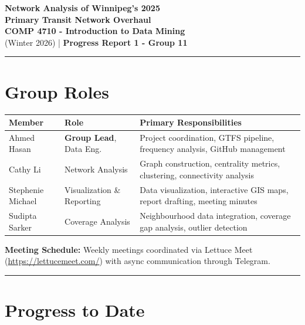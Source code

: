 \documentclass[11pt]{article}
\begin{document}
\small
\begin{center}
    {\LARGE \textbf{Network Analysis of Winnipeg's 2025\\Primary Transit Network Overhaul}}\\[0.4em]
    {\large \textbf{COMP 4710 - Introduction to Data Mining}}\\
    {\large (Winter 2026) | \textbf{Progress Report 1 - Group 11}}
\end{center}
\thispagestyle{fancy}

\vspace{0.2em}
\noindent\rule{\textwidth}{0.4pt}

\section{Group Roles}

\begin{table}[H]
\centering
\small
\begin{tabularx}{\textwidth}{l l X}
\toprule
\textbf{Member} & \textbf{Role} & \textbf{Primary Responsibilities} \\
\midrule
Ahmed Hasan & \textbf{Group Lead}, Data Eng. & Project coordination, GTFS pipeline, frequency analysis, GitHub management \\
Cathy Li & Network Analysis & Graph construction, centrality metrics, clustering, connectivity analysis \\
Stephenie Michael & Visualization \& Reporting & Data visualization, interactive GIS maps, report drafting, meeting minutes \\
Sudipta Sarker & Coverage Analysis & Neighbourhood data integration, coverage gap analysis, outlier detection \\
\bottomrule
\end{tabularx}
\end{table}

\textbf{Meeting Schedule:} Weekly meetings coordinated via Lettuce Meet (\url{https://lettucemeet.com/}) with async communication through Telegram.

\noindent\rule{\textwidth}{0.4pt}

\section{Progress to Date}
\end{document}
